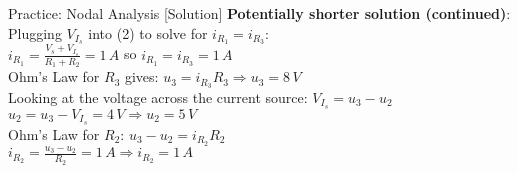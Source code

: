 \begin{frame}{Practice: Nodal Analysis [Solution]}
    \color{blue}
    \textbf{Potentially shorter solution (continued)}: \\[5pt]
    Plugging $V_{I_s}$ into (2) to solve for $i_{R_1} = i_{R_3}$: \\[3pt]
    $i_{R_1} = \frac{V_s + V_{I_s}}{R_1 + R_2} = 1\, A$ so $\boxed{i_{R_1} = i_{R_3} = 1\,A}$ \\[5pt]
    Ohm's Law for $R_3$ gives: $u_3 = i_{R_3} R_3 \Rightarrow \boxed{u_3 = 8\,V}$ \\[5pt]
    Looking at the voltage across the current source: $V_{I_s} = u_3 - u_2$ \\
    $u_2 = u_3 - V_{I_s} = 4\,V \Rightarrow \boxed{u_2 = 5\,V}$ \\[5pt]
    Ohm's Law for $R_2$: $u_3 - u_2 = i_{R_2} R_2$ \\[3pt]
    $i_{R_2} = \frac{u_3 - u_2}{R_2} = 1\,A \Rightarrow \boxed{i_{R_2} = 1\,A}$
\end{frame}